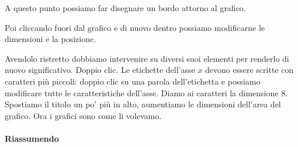 
A questo punto possiamo far disegnare un bordo attorno al grafico.

Poi cliccando fuori dal grafico e di nuovo dentro possiamo modificarne le 
dimensioni e la posizione.

Avendolo ristretto dobbiamo intervenire su diversi suoi elementi per renderlo 
di nuovo significativo. Doppio clic.
Le etichette dell'asse \(x\) devono essere scritte con caratteri 
più piccoli: doppio clic su una parola dell'etichetta e possiamo modificare 
tutte le caratteristiche dell'asse. Diamo ai caratteri la dimensione 8.
Spostiamo il titolo un po' più in alto, aumentiamo le dimensioni dell'area 
del grafico.
Ora i grafici sono come li volevamo.

\salvare[0]

\paragraph{Riassumendo}

